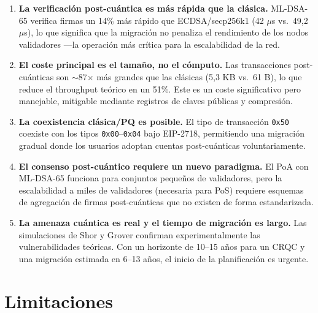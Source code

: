 \begin{enumerate}
  \item \textbf{La verificación post-cuántica es más rápida que la clásica.} ML-DSA-65 verifica firmas un 14\% más rápido que ECDSA/secp256k1 (42 $\mu$s vs.\ 49,2 $\mu$s), lo que significa que la migración no penaliza el rendimiento de los nodos validadores ---la operación más crítica para la escalabilidad de la red.
  
  \item \textbf{El coste principal es el tamaño, no el cómputo.} Las transacciones post-cuánticas son $\sim$87$\times$ más grandes que las clásicas (5,3 KB vs.\ 61 B), lo que reduce el throughput teórico en un 51\%. Este es un coste significativo pero manejable, mitigable mediante registros de claves públicas y compresión.
  
  \item \textbf{La coexistencia clásica/PQ es posible.} El tipo de transacción \texttt{0x50} coexiste con los tipos \texttt{0x00}--\texttt{0x04} bajo EIP-2718, permitiendo una migración gradual donde los usuarios adoptan cuentas post-cuánticas voluntariamente.
  
  \item \textbf{El consenso post-cuántico requiere un nuevo paradigma.} El PoA con ML-DSA-65 funciona para conjuntos pequeños de validadores, pero la escalabilidad a miles de validadores (necesaria para PoS) requiere esquemas de agregación de firmas post-cuánticas que no existen de forma estandarizada.
  
  \item \textbf{La amenaza cuántica es real y el tiempo de migración es largo.} Las simulaciones de Shor y Grover confirman experimentalmente las vulnerabilidades teóricas. Con un horizonte de 10--15 años para un CRQC y una migración estimada en 6--13 años, el inicio de la planificación es urgente.
\end{enumerate}


\section{Limitaciones}
\label{sec:limitaciones}

